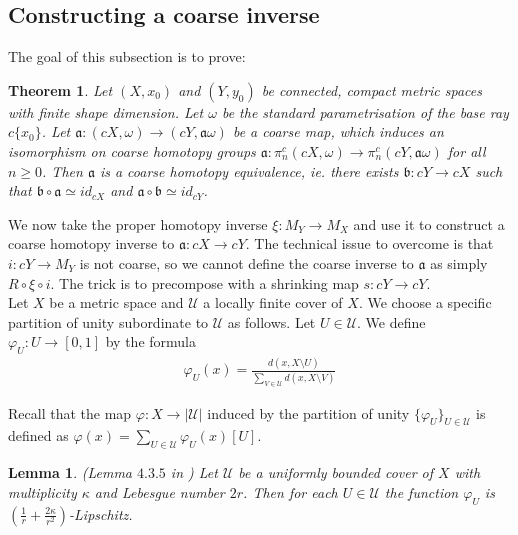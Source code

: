 \documentclass[a4paper,11pt]{article}
\theoremstyle{definition}
\theoremstyle{plain}
\newtheorem{theorem}[definition]{Theorem}
\newtheorem{lemma}[definition]{Lemma}
\theoremstyle{remark}
\begin{document}
{\subsection{Constructing a coarse inverse}

The goal of this subsection is to prove:

\begin{theorem} \label{unbasedwhitehead} Let $(X,x_0)$ and $(Y,y_0)$ be connected, compact metric spaces with finite shape dimension. Let $\omega$ be the standard parametrisation of the base ray $c\{x_0\}$. Let $\mathfrak{a}:(cX,\omega)\rightarrow (cY,\mathfrak{a}\omega)$ be a coarse map, which induces an isomorphism on coarse homotopy groups $\mathfrak{a}: \pi_{n}^{c}(cX,\omega)\rightarrow \pi_{n}^{c}(cY,\mathfrak{a}\omega)$ for all $n\geq 0$. Then $\mathfrak{a}$ is a coarse homotopy equivalence, ie. there exists $\mathfrak{b}: cY\rightarrow cX$ such that $\mathfrak{b}\circ \mathfrak{a} \simeq id_{cX}$ and $\mathfrak{a}\circ \mathfrak{b} \simeq id_{cY}$.
\end{theorem} 

We now take the proper homotopy inverse $\xi: M_{Y}\rightarrow M_{X}$ and use it to construct a coarse homotopy inverse to $\mathfrak{a}: cX\rightarrow cY$. The technical issue to overcome is that $i: cY\rightarrow M_{Y}$ is not coarse, so we cannot define the coarse inverse to $\mathfrak{a}$ as simply $R\circ \xi \circ i$. The trick is to precompose with a shrinking map $s: cY\rightarrow cY$. \\


Let $X$ be a metric space and $\mathcal{U}$ a locally finite cover of $X$. We choose a specific partition of unity subordinate to $\mathcal{U}$ as follows. Let $U\in \mathcal{U}$. We define $\varphi_{U}: U\rightarrow [0,1]$ by the formula
\begin{align*}
\varphi_{U}(x) = \frac{d(x,X\setminus U)}{\sum_{V\in \mathcal{U}} d(x,X\setminus V)}
\end{align*}

Recall that the map $\varphi: X\rightarrow |\mathcal{U}|$ induced by the partition of unity $\{\varphi_{U}\}_{U\in \mathcal{U}}$ is defined as $\varphi(x) = \sum_{U\in \mathcal{U}} \varphi_{U}(x)[U]$. 

\begin{lemma} (Lemma $4.3.5$ in \cite{nowak2023large}) Let $\mathcal{U}$ be a uniformly bounded cover of $X$ with multiplicity $\kappa$ and Lebesgue number $2r$. Then for each $U\in \mathcal{U}$ the function $\varphi_{U}$ is $(\frac{1}{r} + \frac{2\kappa}{r^2})$-Lipschitz. 
\end{lemma}

}
\end{document}
